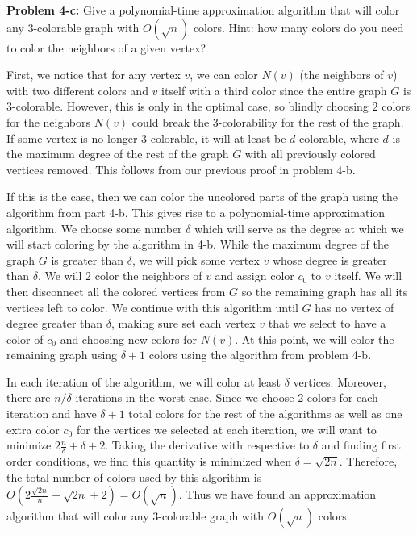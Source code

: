 \documentclass[psamsfonts]{amsart}
\newenvironment{sol}{\vspace{0.25cm}{\large \bfseries Solution:}}{\qedsymbol}
\newenvironment{prob}[1]{\begin{framed}{\large \bfseries Problem #1:}}{\end{framed}}
\begin{document}
\begin{prob}{4-c}
Give a polynomial-time approximation algorithm that will color any 3-colorable graph with $O(\sqrt{n})$ colors. Hint: how many colors do you need to color the neighbors of a given vertex?
\end{prob}
\begin{sol}
First, we notice that for any vertex $v$, we can color $N(v)$ (the neighbors of $v$) with two different colors and $v$ itself with a third color since the entire graph $G$ is 3-colorable. However, this is only in the optimal case, so blindly choosing $2$ colors for the neighbors $N(v)$ could break the 3-colorability for the rest of the graph. If some vertex is no longer 3-colorable, it will at least be $d$ colorable, where $d$ is the maximum degree of the rest of the graph $G$ with all previously colored vertices removed. This follows from our previous proof in problem 4-b. 

If this is the case, then we can color the uncolored parts of the graph using the algorithm from part 4-b. This gives rise to a polynomial-time approximation algorithm. We choose some number $\delta$ which will serve as the degree at which we will start coloring by the algorithm in 4-b. While the maximum degree of the graph $G$ is greater than $\delta$, we will pick some vertex $v$ whose degree is greater than $\delta$. We will 2 color the neighbors of $v$ and assign color $c_0$ to $v$ itself. We will then disconnect all the colored vertices from $G$ so the remaining graph has all its vertices left to color. We continue with this algorithm until $G$ has no vertex of degree greater than $\delta$, making sure set each vertex $v$ that we select to have a color of $c_0$ and choosing new colors for $N(v)$. At this point, we will color the remaining graph using $\delta +1$ colors using the algorithm from problem 4-b.

In each iteration of the algorithm, we will color at least $\delta$ vertices. Moreover, there are $n/\delta$ iterations in the worst case. Since we choose 2 colors for each iteration and have $\delta + 1$ total colors for the rest of the algorithms as well as one extra color $c_0$ for the vertices we selected at each iteration, we will want to minimize $2 \frac{n}{\delta} + \delta + 2$. Taking the derivative with respective to $\delta$ and finding first order conditions, we find this quantity is minimized when $\delta = \sqrt{2n}$. Therefore, the total number of colors used by this algorithm is $O(2 \frac{\sqrt{2n}}{n} + \sqrt{2n} + 2) = O(\sqrt{n})$. Thus we have found an approximation algorithm that will color any 3-colorable graph with $O(\sqrt{n})$ colors.
\end{sol}
\end{document}
